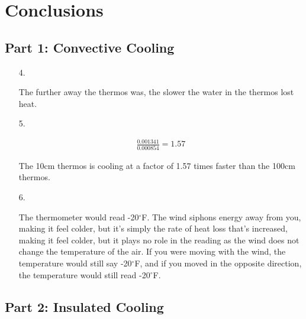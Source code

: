 ﻿\documentclass[12pt, letterpaper]{article}
\begin{document}
    \pagebreak

    \section*{Conclusions}

    \subsection*{Part 1: Convective Cooling}

    \begin{enumerate}
        \item [4.]\mbox{}
        \begin{mdframed}
            The further away the thermos was, the slower the water in the thermos lost heat.
        \end{mdframed}

        \item [5.]\mbox{}
        \begin{mdframed}
            \begin{equation}
                \begin{gathered}
                \frac{0.001341}{0.000854} = 1.57
                \end{gathered}
            \end{equation}

            The 10cm thermos is cooling at a factor of 1.57 times faster than the 100cm thermos.
        \end{mdframed}

        \item [6.]\mbox{}
        \begin{mdframed}
            The thermometer would read -20$^{\circ}$F. The wind siphons energy away from you, making it feel colder, but it's simply the rate of heat loss that's increased, making it feel colder, but it plays no role in the reading as the wind does not change the temperature of the air. If you were moving with the wind, the temperature would still say -20$^{\circ}$F, and if you moved in the opposite direction, the temperature would still read -20$^{\circ}$F.
        \end{mdframed}
    \end{enumerate}

    \subsection*{Part 2: Insulated Cooling}
\end{document}

